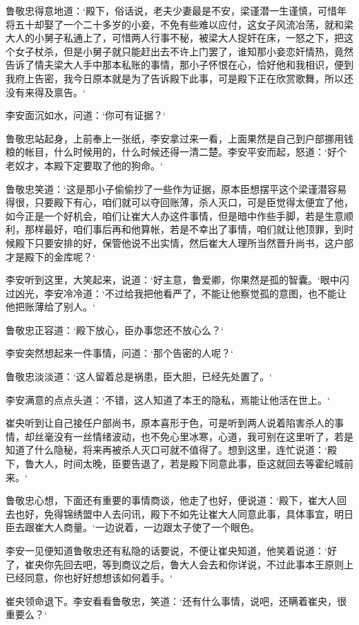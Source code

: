 鲁敬忠得意地道：‘殿下，俗话说，老夫少妻最是不安，梁谨潜一生谨慎，可惜年将五十却娶了一个二十多岁的小妾，不免有些难以应付，这女子风流冶荡，就和梁大人的小舅子私通上了，可惜两人行事不秘，被梁大人捉奸在床，一怒之下，把这个女子杖杀，但是小舅子就只能赶出去不许上门罢了，谁知那小妾恋奸情热，竟然告诉了情夫梁大人手中那本私账的事情，那小子怀恨在心，恰好他和我相识，便到我府上告密，我今日原本就是为了告诉殿下此事，可是殿下正在欣赏歌舞，所以还没有来得及禀告。‘

李安面沉如水，问道：‘你可有证据？‘

鲁敬忠站起身，上前奉上一张纸，李安拿过来一看，上面果然是自己到户部挪用钱粮的帐目，什么时候用的，什么时候还得一清二楚。李安平安而起，怒道：‘好个老奴才，本殿下定要取了他的狗命。‘

鲁敬忠笑道：‘这是那小子偷偷抄了一些作为证据，原本臣想摆平这个梁谨潜容易得很，只要殿下有心，咱们就可以夺回账薄，杀人灭口，可是臣觉得太便宜了他，如今正是一个好机会，咱们让崔大人办这件事情，但是暗中作些手脚，若是生意顺利，那样最好，咱们事后再和他算帐，若是不幸出了事情，咱们就让他顶罪，到时候殿下只要安排的好，保管他说不出实情，然后崔大人理所当然晋升尚书，这户部才是殿下的金库呢？‘

李安听到这里，大笑起来，说道：‘好主意，鲁爱卿，你果然是孤的智囊。‘眼中闪过凶光，李安冷冷道：‘不过给我把他看严了，不能让他察觉孤的意图，也不能让他把账薄给了别人。‘

鲁敬忠正容道：‘殿下放心，臣办事您还不放心么？‘

李安突然想起来一件事情，问道：‘那个告密的人呢？‘

鲁敬忠淡淡道：‘这人留着总是祸患，臣大胆，已经先处置了。‘

李安满意的点点头道：‘不错，这人知道了本王的隐私，焉能让他活在世上。‘

崔央听到让自己接任户部尚书，原本喜形于色，可是听到两人说着陷害杀人的事情，却丝毫没有一丝情绪波动，也不免心里冰寒，心道，我可别在这里听了，若是知道了什么隐秘，将来再被杀人灭口可就不值得了。想到这里，连忙说道：‘殿下，鲁大人，时间太晚，臣要告退了，若是殿下同意此事，臣这就回去等霍纪城前来。‘

鲁敬忠心想，下面还有重要的事情商谈，他走了也好，便说道：‘殿下，崔大人回去也好，免得锦绣盟中人去问讯，殿下不如先让崔大人同意此事，具体事宜，明日臣去跟崔大人商量。‘一边说着，一边跟太子使了一个眼色。

李安一见便知道鲁敬忠还有私隐的话要说，不便让崔央知道，他笑着说道：‘好了，崔央你先回去吧，等到商议之后，鲁大人会去和你详说，不过此事本王原则上已经同意，你也好好想想该如何着手。‘

崔央领命退下。李安看看鲁敬忠，笑道：‘还有什么事情，说吧，还瞒着崔央，很重要么？‘

